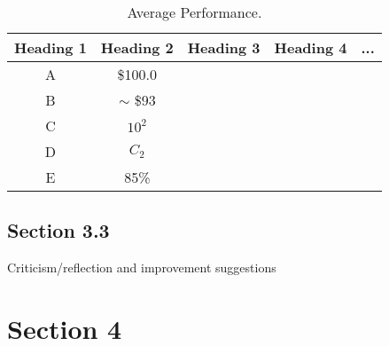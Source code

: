 \documentclass[a4paper]{article} %
\begin{document}
\begin{table}[h!]
    \centering
    \begin{tabular}{|c|c|c|c|c|}
    \hline
        Heading 1 & Heading 2 & Heading 3 & Heading 4 & ... \\
    \hline
    A & \$100.0 &&& \\\hline
    B & $\sim$ \$93 &&& \\\hline
    C & $10^2$ &&& \\\hline
    D & $C_2$ &&& \\\hline
    E & 85\% &&& \\\hline
    \end{tabular}
    \label{tab:my_label}
    \caption{Average Performance.}
\end{table}

\subsection{Section 3.3}
Criticism/reflection and improvement suggestions


\section{Section 4}




\end{document}
